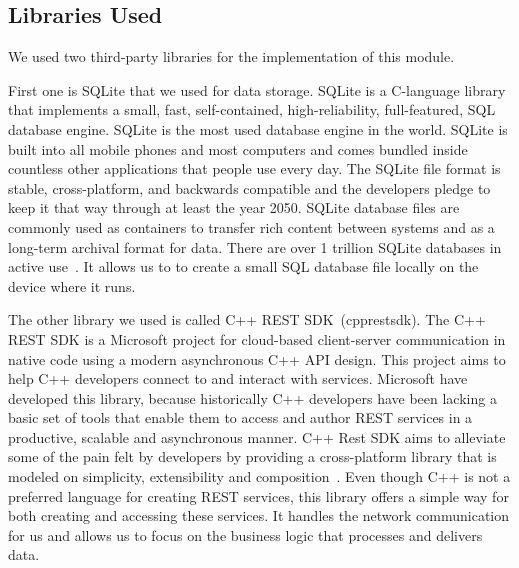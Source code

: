 \subsection{Libraries Used}
We used two third-party libraries for the implementation of this module.
\par
First one is SQLite that we used for data storage. SQLite is a C-language library that implements a small, fast, self-contained, high-reliability, full-featured, SQL database engine. SQLite is the most used database engine in the world. SQLite is built into all mobile phones and most computers and comes bundled inside countless other applications that people use every day. The SQLite file format is stable, cross-platform, and backwards compatible and the developers pledge to keep it that way through at least the year 2050. SQLite database files are commonly used as containers to transfer rich content between systems and as a long-term archival format for data. There are over 1 trillion SQLite databases in active use~\citep{sqlite}. It allows us to to create a small SQL database file locally on the device where it runs.
\par
The other library we used is called C++ REST SDK~(cpprestsdk). The C++ REST SDK is a Microsoft project for cloud-based client-server communication in native code using a modern asynchronous C++ API design. This project aims to help C++ developers connect to and interact with services. Microsoft have developed this library, because historically C++ developers have been lacking a basic set of tools that enable them to access and author REST services in a productive, scalable and asynchronous manner. C++ Rest SDK aims to alleviate some of the pain felt by developers by providing a cross-platform library that is modeled on simplicity, extensibility and composition~\citep{cpprestsdk}. Even though C++ is not a preferred language for creating REST services, this library offers a simple way for both creating and accessing these services. It handles the network communication for us and allows us to focus on the business logic that processes and delivers data.

